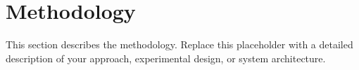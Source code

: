 
\section{Methodology}


This section describes the methodology. Replace this placeholder with a
detailed description of your approach, experimental design, or system
architecture.
